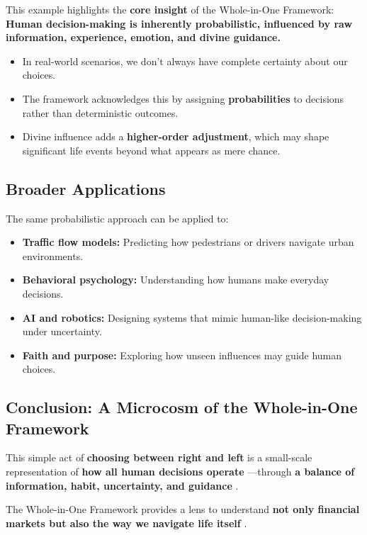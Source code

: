 \documentclass{article}
\begin{document}
This example highlights the {\bf core insight}  of the Whole-in-One Framework: {\bf Human decision-making is inherently probabilistic, influenced by raw information, experience, emotion, and divine guidance.} 

\begin{itemize}
\item   In real-world scenarios, we don't always have complete certainty about our choices.
\item  The framework acknowledges this by assigning {\bf probabilities}  to decisions rather than deterministic outcomes.
\item   Divine influence adds a {\bf higher-order adjustment}, which may shape significant life events beyond what appears as mere chance.
\end{itemize}


\subsection*{Broader Applications}

The same probabilistic approach can be applied to:

\begin{itemize}
\item   {\bf Traffic flow models:}  Predicting how pedestrians or drivers navigate urban environments.
\item   {\bf Behavioral psychology:}  Understanding how humans make everyday decisions.
\item  {\bf AI and robotics:}  Designing systems that mimic human-like decision-making under uncertainty.
\item   {\bf Faith and purpose:}  Exploring how unseen influences may guide human choices.
\end{itemize}

\subsection*{Conclusion: A Microcosm of the Whole-in-One Framework}

This simple act of {\bf choosing between right and left}  is a small-scale representation of {\bf how all human decisions operate} ---through {\bf a balance of information, habit, uncertainty, and guidance} .  

The Whole-in-One Framework provides a lens to understand {\bf not only financial markets but also the way we navigate life itself} .
\end{document}
